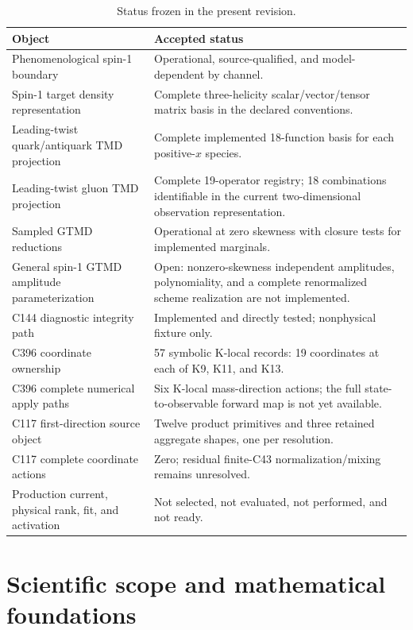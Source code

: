 \documentclass[11pt,oneside]{book}
\begin{document}
\begin{longtable}{@{}p{}p{}@{}}
\caption{Status frozen in the present revision.}\label{tab:revision-status}\\
\toprule
\textbf{Object}&\textbf{Accepted status}\\
\midrule
Phenomenological spin-1 boundary&Operational, source-qualified, and model-dependent by channel.\\
Spin-1 target density representation&Complete three-helicity scalar/vector/tensor matrix basis in the declared conventions.\\
Leading-twist quark/antiquark TMD projection&Complete implemented 18-function basis for each positive-$x$ species.\\
Leading-twist gluon TMD projection&Complete 19-operator registry; 18 combinations identifiable in the current two-dimensional observation representation.\\
Sampled GTMD reductions&Operational at zero skewness with closure tests for implemented marginals.\\
General spin-1 GTMD amplitude parameterization&Open: nonzero-skewness independent amplitudes, polynomiality, and a complete renormalized scheme realization are not implemented.\\
C144 diagnostic integrity path&Implemented and directly tested; nonphysical fixture only.\\
C396 coordinate ownership&57 symbolic K-local records: 19 coordinates at each of K9, K11, and K13.\\
C396 complete numerical apply paths&Six K-local mass-direction actions; the full state-to-observable forward map is not yet available.\\
C117 first-direction source object&Twelve product primitives and three retained aggregate shapes, one per resolution.\\
C117 complete coordinate actions&Zero; residual finite-C43 normalization/mixing remains unresolved.\\
Production current, physical rank, fit, and activation&Not selected, not evaluated, not performed, and not ready.\\
\bottomrule
\end{longtable}

\tableofcontents
\listoftables

\mainmatter

\part{Scientific scope and mathematical foundations}
\end{document}
